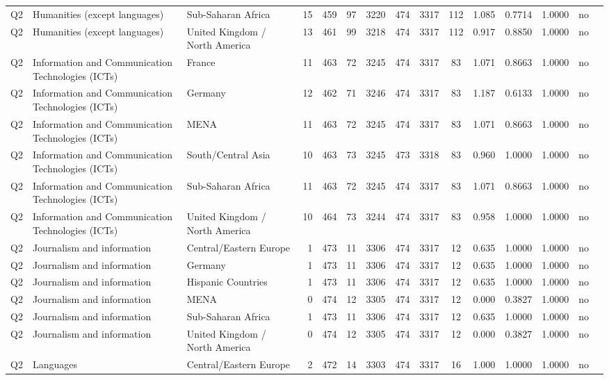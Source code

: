 \begin{longtable}{lllrcccccccccll}
Q2 & Humanities (except languages) & Sub-Saharan Africa & 15 & 459 & 97 & 3220 & 474 & 3317 & 112 & 1.085 & 0.7714 & 1.0000 & no \\
Q2 & Humanities (except languages) & United Kingdom / North America & 13 & 461 & 99 & 3218 & 474 & 3317 & 112 & 0.917 & 0.8850 & 1.0000 & no \\
Q2 & Information and Communication Technologies (ICTs) & France & 11 & 463 & 72 & 3245 & 474 & 3317 & 83 & 1.071 & 0.8663 & 1.0000 & no \\
Q2 & Information and Communication Technologies (ICTs) & Germany & 12 & 462 & 71 & 3246 & 474 & 3317 & 83 & 1.187 & 0.6133 & 1.0000 & no \\
Q2 & Information and Communication Technologies (ICTs) & MENA & 11 & 463 & 72 & 3245 & 474 & 3317 & 83 & 1.071 & 0.8663 & 1.0000 & no \\
Q2 & Information and Communication Technologies (ICTs) & South/Central Asia & 10 & 463 & 73 & 3245 & 473 & 3318 & 83 & 0.960 & 1.0000 & 1.0000 & no \\
Q2 & Information and Communication Technologies (ICTs) & Sub-Saharan Africa & 11 & 463 & 72 & 3245 & 474 & 3317 & 83 & 1.071 & 0.8663 & 1.0000 & no \\
Q2 & Information and Communication Technologies (ICTs) & United Kingdom / North America & 10 & 464 & 73 & 3244 & 474 & 3317 & 83 & 0.958 & 1.0000 & 1.0000 & no \\
Q2 & Journalism and information & Central/Eastern Europe & 1 & 473 & 11 & 3306 & 474 & 3317 & 12 & 0.635 & 1.0000 & 1.0000 & no \\
Q2 & Journalism and information & Germany & 1 & 473 & 11 & 3306 & 474 & 3317 & 12 & 0.635 & 1.0000 & 1.0000 & no \\
Q2 & Journalism and information & Hispanic Countries & 1 & 473 & 11 & 3306 & 474 & 3317 & 12 & 0.635 & 1.0000 & 1.0000 & no \\
Q2 & Journalism and information & MENA & 0 & 474 & 12 & 3305 & 474 & 3317 & 12 & 0.000 & 0.3827 & 1.0000 & no \\
Q2 & Journalism and information & Sub-Saharan Africa & 1 & 473 & 11 & 3306 & 474 & 3317 & 12 & 0.635 & 1.0000 & 1.0000 & no \\
Q2 & Journalism and information & United Kingdom / North America & 0 & 474 & 12 & 3305 & 474 & 3317 & 12 & 0.000 & 0.3827 & 1.0000 & no \\
Q2 & Languages & Central/Eastern Europe & 2 & 472 & 14 & 3303 & 474 & 3317 & 16 & 1.000 & 1.0000 & 1.0000 & no \\

\end{longtable}
